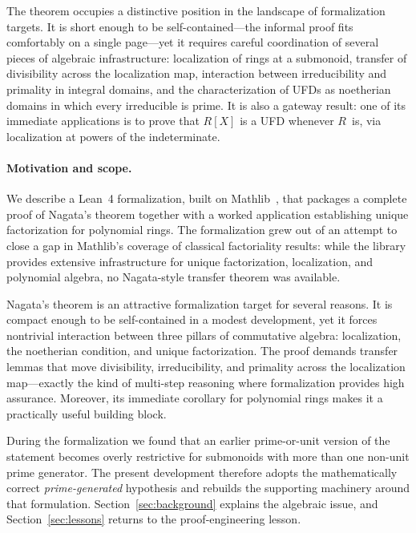 \documentclass[11pt]{article}
\theoremstyle{plain}
\theoremstyle{definition}
\theoremstyle{remark}
\begin{document}
The theorem occupies a distinctive position in the landscape of formalization
targets.  It is short enough to be self-contained---the informal proof fits
comfortably on a single page---yet it requires careful coordination of several
pieces of algebraic infrastructure: localization of rings at a submonoid,
transfer of divisibility across the localization map, interaction between
irreducibility and primality in integral domains, and the characterization of
UFDs as noetherian domains in which every irreducible is prime.  It is also a
gateway result: one of its immediate applications is to prove that $R[X]$ is a
UFD whenever $R$~is, via localization at powers of the indeterminate.

\paragraph{Motivation and scope.}
We describe a Lean~4 formalization, built on Mathlib~\cite{mathlib}, that
packages a complete proof of Nagata's theorem together with a worked
application establishing unique factorization for polynomial rings.  The
formalization grew out of an attempt to close a gap in Mathlib's coverage of
classical factoriality results: while the library provides extensive
infrastructure for unique factorization, localization, and polynomial algebra,
no Nagata-style transfer theorem was available.

Nagata's theorem is an attractive formalization target for several reasons.
It is compact enough to be self-contained in a modest development, yet it
forces nontrivial interaction between three pillars of commutative algebra:
localization, the noetherian condition, and unique factorization.  The proof
demands transfer lemmas that move divisibility, irreducibility, and primality
across the localization map---exactly the kind of multi-step reasoning where
formalization provides high assurance.  Moreover, its immediate corollary for
polynomial rings makes it a practically useful building block.

During the formalization we found that an earlier prime-or-unit version of the
statement becomes overly restrictive for submonoids with more than one non-unit
prime generator.  The present development therefore adopts the mathematically correct
\emph{prime-generated} hypothesis and rebuilds the supporting machinery around
that formulation.  Section~\ref{sec:background} explains the algebraic issue,
and Section~\ref{sec:lessons} returns to the proof-engineering lesson.
\end{document}
